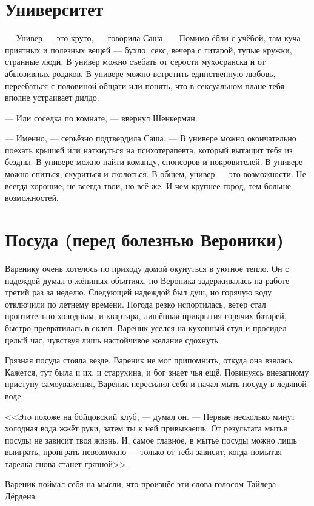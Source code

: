 \documentclass[a4paper,10pt,fleqn]{book}\usepackage{polyglossia}\setdefaultlanguage{english}\setotherlanguage{russian}\defaultfontfeatures{Ligatures=TeX,Mapping=tex-text} \usepackage{xcolor}\definecolor{lightgray}{HTML}{bbbbbb}\color{lightgray}\newcommand{\ml}[3]{\textcolor{black}{#3}}
\begin{document}
\section{Университет}

--- Универ --- это круто, --- говорила Саша.
--- Помимо ёбли с учёбой, там куча приятных и полезных вещей --- бухло, секс, вечера с гитарой, тупые кружки, странные люди.
В универ можно съебать от серости мухосранска и от абьюзивных родаков.
В универе можно встретить единственную любовь, переебаться с половиной общаги или понять, что в сексуальном плане тебя вполне устраивает дилдо.

--- Или соседка по комнате, --- ввернул Шенкерман.

--- Именно, --- серьёзно подтвердила Саша.
--- В универе можно окончательно поехать крышей или наткнуться на психотерапевта, который вытащит тебя из бездны.
В универе можно найти команду, спонсоров и покровителей.
В универе можно спиться, скуриться и сколоться.
В общем, универ --- это возможности.
Не всегда хорошие, не всегда твои, но всё же.
И чем крупнее город, тем больше возможностей.

\section{Посуда (перед болезнью Вероники)}

Варенику очень хотелось по приходу домой окунуться в уютное тепло.
Он с надеждой думал о жёниных объятиях, но Вероника задерживалась на работе --- третий раз за неделю.
Следующей надеждой был душ, но горячую воду отключили по летнему времени.
Погода резко испортилась, ветер стал пронзительно-холодным, и квартира, лишённая прикрытия горячих батарей, быстро превратилась в склеп.
Вареник уселся на кухонный стул и просидел целый час, чувствуя лишь настойчивое желание сдохнуть.

Грязная посуда стояла везде.
Вареник не мог припомнить, откуда она взялась.
Кажется, тут была и их, и старухина, и бог знает чья ещё.
Повинуясь внезапному приступу самоуважения, Вареник пересилил себя и начал мыть посуду в ледяной воде.

<<Это похоже на бойцовский клуб, --- думал он.
--- Первые несколько минут холодная вода жжёт руки, затем ты к ней привыкаешь.
От результата мытья посуды не зависит твоя жизнь.
И, самое главное, в мытье посуды можно лишь выиграть, проиграть невозможно --- только от тебя зависит, когда помытая тарелка снова станет грязной>>.

Вареник поймал себя на мысли, что произнёс эти слова голосом Тайлера Дёрдена.
\end{document}
